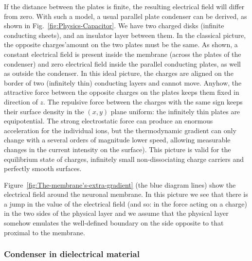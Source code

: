 If the 
distance between the plates is finite, the resulting electrical field will differ from zero. 
With such a model, a usual parallel plate condenser can be derived, as shown in Fig.~\ref{fig:Physics-Capacitor}.
We have two charged disks (infinite conducting sheets), and 
an insulator layer between them. In the classical picture, 
the opposite charges'amount on the two plates must be the same.
As shown, a constant electrical field is present inside the membrane (across the plates of the condenser) and zero electrical field inside the parallel conducting plates, as well as outside the condenser.
In this ideal picture, the charges are aligned on the border of two (infinitely thin) conducting layers and cannot move.
Anyhow, the attractive force between the opposite charges on the plates 
keeps them fixed in direction of $z$. The repulsive force
between the charges with the same sign keeps their surface density in the $(x,y)$ plane uniform: the infinitely thin plates are equipotential.
The strong electrostatic force can produce an enormous acceleration for the individual ions, but the thermodynamic gradient can only change with a several orders of magnitude lower speed, allowing measurable changes in the current intensity on the surface).
This picture is valid for the equilibrium state of charges, infinitely small non-dissociating charge carriers and perfectly smooth surfaces. 

Figure~\ref{fig:The-membrane's-extra-gradient} (the blue diagram lines) show the electrical field around the neuronal membrane.
In this picture we see that there is a jump in the value of the electrical field (and so: in the force acting on a charge)
in the two sides of the physical layer and we assume that the physical layer somehow emulates the well-defined boundary
on the side opposite to that proximal to the membrane. 



\subsubsection[Biological condenser]{Condenser in dielectrical material\label{sec:Physics-CondenserEffect}}


